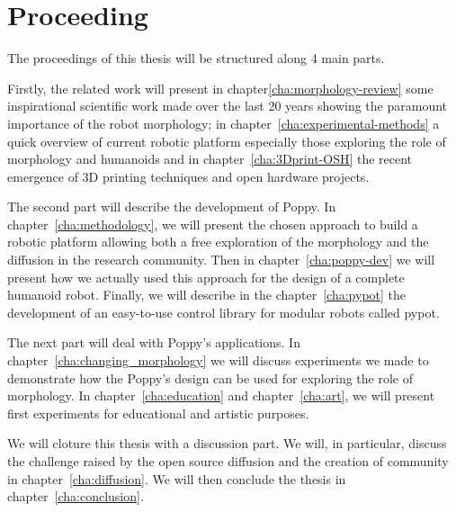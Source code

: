 \section*{Proceeding} %
The proceedings of this thesis will be structured along 4 main parts.

Firstly, the related work will present in chapter\ref{cha:morphology-review} some inspirational scientific work made over the last 20 years showing the paramount importance of the robot morphology; in chapter~\ref{cha:experimental-methods} a quick overview of current robotic platform especially those exploring the role of morphology and humanoids and in chapter~\ref{cha:3Dprint-OSH} the recent emergence of 3D printing techniques and open hardware projects.

The second part will describe the development of Poppy. In chapter~\ref{cha:methodology}, we will present the chosen approach to build a robotic platform allowing both a free exploration of the morphology and the diffusion in the research community. Then in chapter~\ref{cha:poppy-dev} we will present how we actually used this approach for the design of a complete humanoid robot. Finally, we will describe in the chapter~\ref{cha:pypot} the development of an easy-to-use control library for modular robots called pypot.

The next part will deal with Poppy's applications. In chapter~\ref{cha:changing_morphology} we will discuss experiments we made to demonstrate how the Poppy's design can be used for exploring the role of morphology. In chapter~\ref{cha:education} and chapter~\ref{cha:art}, we will present first experiments for educational and artistic purposes.

We will cloture this thesis with a discussion part. We will, in particular, discuss the challenge raised by the open source diffusion and the creation of community in chapter~\ref{cha:diffusion}. We will then conclude the thesis in chapter~\ref{cha:conclusion}.
